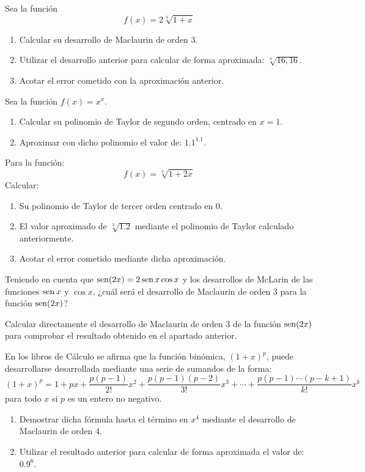{Sea la función
\[
f(x) = 2\sqrt[4]{{1 + x}}
\]
\begin{enumerate}
\item Calcular su desarrollo de Maclaurin de orden 3.
\item Utilizar el desarrollo anterior para calcular de forma aproximada: $\sqrt[4]{{16,16}}$.
\item Acotar el error cometido con la aproximación anterior.
\end{enumerate}
}


{
Sea la función $f(x)=x^{x}.$
\begin{enumerate}
\item  Calcular su polinomio de Taylor de segundo orden, centrado en $x=1$.
\item  Aproximar con dicho polinomio el valor de: $1.1^{1.1}$.
\end{enumerate}
}


{Para la función:
\[
f(x)=\sqrt[3]{1+2x}
\]
Calcular:
\begin{enumerate}
\item  Su polinomio de Taylor de tercer orden centrado en 0.
\item  El valor aproximado de $\sqrt[3]{1.2}$ mediante el polinomio de Taylor calculado anteriormente.
\item  Acotar el error cometido mediante dicha aproximación.
\end{enumerate}
}


{Teniendo en cuenta que $\operatorname{sen} (2x)=2\operatorname{sen} x \cos x$ y los desarrollos de McLarin de las funciones $\operatorname{sen} x$ y $\cos x$, ¿cuál será el desarrollo de Maclaurin de orden 3 para la función $\operatorname{sen} (2x)$?

Calcular directamente el desarrollo de Maclaurin de orden 3 de la función $\operatorname{sen} (2x)$ para comprobar el resultado obtenido en el apartado anterior.
}


{En los libros de Cálculo se afirma que la función binómica, $(1+x)^p$, puede desarrollarse desarrollada mediante una serie de sumandos de la forma:
\[
\left( {1 + x} \right)^p  = 1 + px + \frac{{p(p - 1)}} {{2!}}x^2 + \frac{{p(p - 1)(p - 2)}} {{3!}}x^3  +  \cdots  + \frac{{p(p - 1) \cdots (p - k + 1)}} {{k!}}x^k
\]
para todo $x$ si $p$ es un entero no negativo.
\begin{enumerate}
\item Demostrar dicha fórmula hasta el término en $x^4$ mediante el desarrollo de Maclaurin de orden 4.
\item Utilizar el resultado anterior para calcular de forma aproximada el valor de: $0.9^6$.
\end{enumerate}
}


